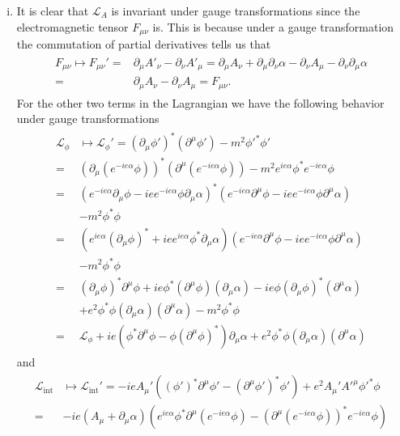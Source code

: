 \documentclass{article}
\begin{document}
\begin{enumerate}
\begin{enumerate}[(i)]
\item It is clear that $\mathcal{L}_A$ is invariant under gauge transformations since the electromagnetic tensor $F_{\mu\nu}$ is. This is because under a gauge transformation the commutation of partial derivatives tells us that
\begin{align}
\begin{split}
F_{\mu\nu}\mapsto F_{\mu\nu}'=&\partial_\mu A'_\nu-\partial_\nu A'_\mu=\partial_\mu A_\nu +\partial_\mu\partial_\nu\alpha-\partial_\nu A_\mu -\partial_\nu\partial_\mu\alpha\\
=&\partial_\mu A_\nu-\partial_\nu A_\mu=F_{\mu\nu}.
\end{split}
\end{align}
For the other two terms in the Lagrangian we have the following behavior under gauge transformations
\begin{align}
\begin{split}
\mathcal{L}_\phi &\mapsto \mathcal{L}_\phi'=(\partial_\mu\phi')^*(\partial^\mu\phi')-m^2{\phi'}^*\phi' \\
=&(\partial_\mu(e^{-ie\alpha}\phi))^*(\partial^\mu(e^{-ie\alpha}\phi))-m^2e^{ie\alpha}{\phi}^*e^{-ie\alpha}\phi \\
=&(e^{-ie\alpha}\partial_\mu\phi-iee^{-ie\alpha}\phi\partial_\mu\alpha)^*(e^{-ie\alpha}\partial^\mu\phi-iee^{-ie\alpha}\phi\partial^\mu\alpha)\\
&-m^2\phi^*\phi \\
=&(e^{ie\alpha}(\partial_\mu\phi)^*+iee^{ie\alpha}\phi^*\partial_\mu\alpha)(e^{-ie\alpha}\partial^\mu\phi-iee^{-ie\alpha}\phi\partial^\mu\alpha)\\
&-m^2\phi^*\phi \\
=&(\partial_\mu\phi)^*\partial^\mu\phi+ie\phi^*(\partial^\mu\phi)(\partial_\mu\alpha)-ie\phi(\partial_\mu\phi)^*(\partial^\mu\alpha)\\
&+e^2\phi^*\phi(\partial_\mu\alpha)(\partial^\mu\alpha)-m^2\phi^*\phi\\
=&\mathcal{L}_\phi+ie(\phi^*\partial^\mu\phi-\phi(\partial^\mu\phi)^*)\partial_\mu\alpha+e^2\phi^*\phi(\partial_\mu\alpha)(\partial^\mu\alpha)
\end{split}
\end{align}
and
\begin{align}
\begin{split}
\mathcal{L}_{\text{int}}&\mapsto \mathcal{L}_{\text{int}}'=-ieA_\mu'((\phi')^*\partial^\mu\phi'-(\partial^\mu\phi')^*\phi')+e^2A_\mu'{A'}^\mu{\phi'}^*\phi\\
=&-ie(A_\mu+\partial_\mu\alpha)(e^{ie\alpha}\phi^*\partial^\mu(e^{-ie\alpha}\phi)-(\partial^\mu(e^{-ie\alpha}\phi))^*e^{-ie\alpha}\phi)\\

\end{split}
\end{align}
\end{enumerate}
\end{enumerate}
\end{document}
